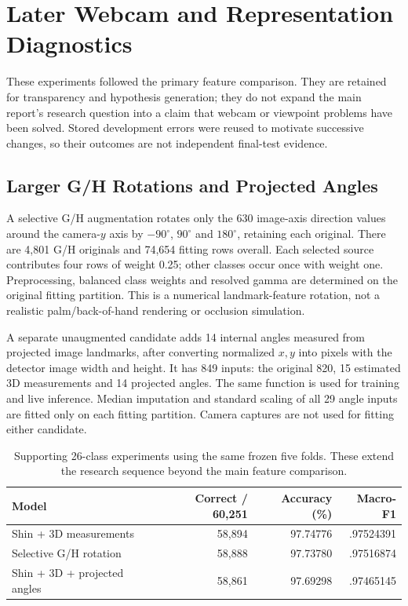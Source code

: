 \section{Later Webcam and Representation Diagnostics}
These experiments followed the primary feature comparison. They are retained for transparency and hypothesis generation; they do not expand the main report's research question into a claim that webcam or viewpoint problems have been solved. Stored development errors were reused to motivate successive changes, so their outcomes are not independent final-test evidence.

\subsection{Larger G/H Rotations and Projected Angles}
A selective G/H augmentation rotates only the 630 image-axis direction values around the camera-$y$ axis by $-90^\circ$, $90^\circ$ and $180^\circ$, retaining each original. There are 4,801 G/H originals and 74,654 fitting rows overall. Each selected source contributes four rows of weight 0.25; other classes occur once with weight one. Preprocessing, balanced class weights and resolved gamma are determined on the original fitting partition. This is a numerical landmark-feature rotation, not a realistic palm/back-of-hand rendering or occlusion simulation.

A separate unaugmented candidate adds 14 internal angles measured from projected image landmarks, after converting normalized $x,y$ into pixels with the detector image width and height. It has 849 inputs: the original 820, 15 estimated 3D measurements and 14 projected angles. The same function is used for training and live inference. Median imputation and standard scaling of all 29 angle inputs are fitted only on each fitting partition. Camera captures are not used for fitting either candidate.

\begin{table}[h]\centering\caption{Supporting 26-class experiments using the same frozen five folds. These extend the research sequence beyond the main feature comparison.}
\begin{tabular}{lrrr}\toprule
Model & Correct / 60,251 & Accuracy (\%) & Macro-F1\\\midrule
Shin + 3D measurements & 58,894 & 97.74776 & .97524391\\
Selective G/H rotation & 58,888 & 97.73780 & .97516874\\
Shin + 3D + projected angles & 58,861 & 97.69298 & .97465145\\\bottomrule\end{tabular}\end{table}

